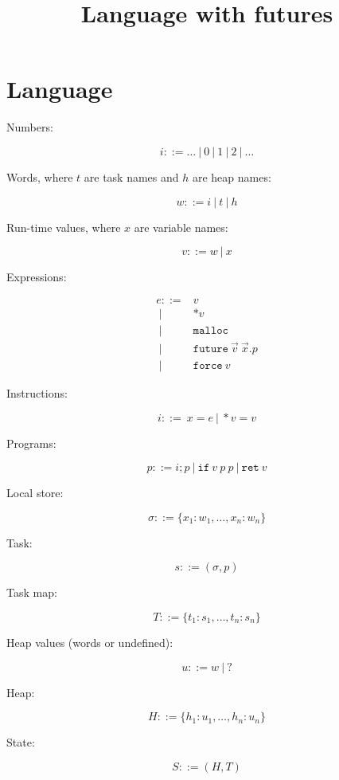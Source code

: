 \documentclass{article}
\title{Language with futures}
\date{}
\newcommand{\Prog}{p}
\newcommand{\Word}{w}
\newcommand{\Val}{v}
\newcommand{\HeapMap}{H}
\newcommand{\TaskMap}{T}
\newcommand{\Task}{s}
\newcommand{\TName}{t}
\newcommand{\HName}{h}
\newcommand{\State}{S}
\newcommand{\Store}{\sigma}
\newcommand{\Inst}{i}
\newcommand{\Ret}[1][\Val]{\mathtt{ret}\ {#1}}
\newcommand{\Var}{x}
\newcommand{\Exp}{e}
\newcommand{\Deref}[1][\Val]{*{#1}}
\newcommand{\Nat}{i}
\newcommand{\Malloc}{\mathtt{malloc}}
\newcommand{\Future}[3]{\mathtt{future}\ {#1}\ {#2}.{#3}}
\newcommand{\Force}[1][\Val]{\mathtt{force}\ {#1}}
\newcommand{\If}[3][\Val]{\mathtt{if}\ {#1}\ {#2}\ {#3}}
\newcommand{\HeapVal}{u}
\newcommand{\grmor}{|}
\newcommand{\Grmor}{\ \grmor\ }
\newcommand{\Grmeq}{::=}
\begin{document}
\maketitle

\section{Language}


Numbers:

$$
\Nat \Grmeq \dots \Grmor 0 \Grmor 1 \Grmor 2 \Grmor \dots
$$

Words, where $\TName$ are task names and $\HName$ are heap names:

$$
\Word \Grmeq \Nat \Grmor \TName \Grmor \HName
$$

Run-time values, where $\Var$ are variable names:

$$
\Val \Grmeq \Word \Grmor \Var
$$

Expressions:

$$
\begin{aligned}
\Exp    \Grmeq & \Val  \\
        \Grmor & \Deref \\
        \Grmor & \Malloc \\
        \Grmor & \Future {\vec \Val}  {\vec \Var} \Prog \\
        \Grmor & \Force 
\end{aligned}
$$

Instructions:

$$
\Inst   ::=\  \Var = \Exp \ |\ * \Val = \Val 
$$

Programs:

$$
\Prog ::= \Inst; \Prog \ |\ \If \Prog \Prog \ |\ \Ret
$$

Local store:

$$
\sigma ::= \{\Var_1:\Word_1,\dots,\Var_n:\Word_n\}
$$

Task:

$$
\Task \Grmeq (\Store, \Prog)
$$

Task map:

$$
\TaskMap ::= \{\TName_1:\Task_1,\dots,\TName_n:\Task_n\}
$$

Heap values (words or undefined):

$$
\HeapVal \Grmeq \Word \Grmor ?
$$

Heap:

$$
\HeapMap ::= \{\HName_1\colon \HeapVal_1,\dots,\HName_n\colon \HeapVal_n\}
$$

State:

$$
\State ::= (\HeapMap,\TaskMap)
$$
\end{document}

